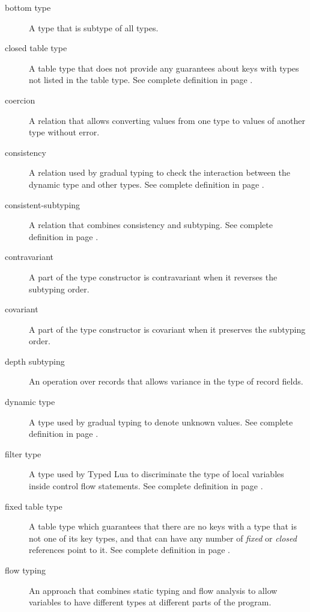 \begin{description}
\item[bottom type] A type that is subtype of all types.

\item[closed table type] A table type that does not provide any guarantees
about keys with types not listed in the table type.
See complete definition in page \pageref{def:tabletype}.

\item[coercion] A relation that allows converting values from one type to
values of another type without error.

\item[consistency] A relation used by gradual typing to check the interaction
between the dynamic type and other types.
See complete definition in page \pageref{def:consistency}.

\item[consistent-subtyping] A relation that combines consistency and subtyping.
See complete definition in page \pageref{def:consistent-subtyping}.

\item[contravariant] A part of the type constructor is contravariant when
it reverses the subtyping order.

\item[covariant] A part of the type constructor is covariant when
it preserves the subtyping order.

\item[depth subtyping] An operation over records that allows variance in the type of
record fields.

\item[dynamic type] A type used by gradual typing to denote unknown values.
See complete definition in page \pageref{def:dynamictype}.

\item[filter type] A type used by Typed Lua to discriminate the type of
local variables inside control flow statements.
See complete definition in page \pageref{def:filtertype}.

\item[fixed table type] A table type which guarantees that there are no
keys with a type that is not one of its key types, and that can have
any number of \emph{fixed} or \emph{closed} references point to it.
See complete definition in page \pageref{def:tabletype}.

\item[flow typing] An approach that combines static typing and flow analysis to
allow variables to have different types at different parts of the program.


\end{description}
